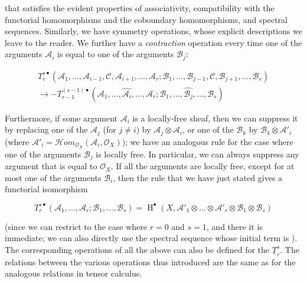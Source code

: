 that satisfies the evident properties of associativity, compatibility with the functorial homomorphisms and the coboundary homomorphisms, and spectral sequences.
Similarly, we have symmetry operations, whose explicit descriptions we leave to the reader.
We further have a \emph{contraction} operation every time one of the arguments $\mathcal{A}_i$ is equal to one of the arguments $\mathcal{B}_j$:

\begin{equation}\tag{8.4}\label{fga1-equation-8.4}
  \begin{aligned}
    T_r^{s\bullet}(\mathcal{A}_1,\ldots,\mathcal{A}_{i-1},\mathcal{C},\mathcal{A}_{i+1},\ldots,\mathcal{A}_r;\mathcal{B}_1,\ldots,\mathcal{B}_{j-1},\mathcal{C},\mathcal{B}_{j+1},\ldots,\mathcal{B}_s)
    \\\to -T_{r-1}^{(s-1)\bullet}(\mathcal{A}_1,\ldots,\widehat{\mathcal{A}_i},\ldots,\mathcal{A}_r;\mathcal{B}_1,\ldots,\widehat{\mathcal{B}_j},\ldots,\mathcal{B}_s)
  \end{aligned}
\end{equation}

Furthermore, if some argument $\mathcal{A}_i$ is a locally-free sheaf, then we can suppress it by replacing one of the $\mathcal{A}_j$ (for $j\neq i$) by $\mathcal{A}_j\otimes\mathcal{A}_i$, or one of the $\mathcal{B}_k$ by $\mathcal{B}_k\otimes\mathcal{A}'_i$ (where $\mathcal{A}'_i=\mathcal{H}om_{\mathcal{O}_X}(\mathcal{A}_i,\mathcal{O}_X)$);
we have an analogous rule for the case where one of the arguments $\mathcal{B}_j$ is locally free.
In particular, we can always suppress any argument that is equal to $\mathcal{O}_X$.
If all the arguments are locally free, except for at most one of the arguments $\mathcal{B}_i$, then the rule that we have just stated gives a functorial isomorphism

\begin{equation}\tag{8.5}\label{fga1-equation-8.5}
  T_r^{s\bullet}(\mathcal{A}_1,\ldots,\mathcal{A}_r;\mathcal{B}_1,\ldots,\mathcal{B}_s)
  = \operatorname{H}^\bullet(X,\mathcal{A}'_1\otimes\ldots\otimes\mathcal{A}'_{r}\otimes\mathcal{B}_1\otimes\mathcal{B}_s)
\end{equation}

(since we can restrict to the case where $r=0$ and $s=1$, and there it is immediate;
we can also directly use the spectral sequence whose initial term is ).
The corresponding operations of all the above can also be defined for the $\underline{T}_r^s$.
The relations between the various operations thus introduced are the same as for the analogous relations in tensor calculus.

